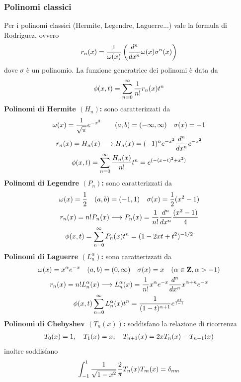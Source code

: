 \documentclass{article}
\begin{document}
\subsubsection{Polinomi classici}
Per i polinomi classici (Hermite, Legendre, Laguerre...) vale la formula di Rodriguez, ovvero
\begin{gather}
    r_n(x) = \frac{1}{\omega(x)}\left(\frac{d^n}{dx^n}\omega(x)\sigma^n(x)\right) \notag
\end{gather}
dove $\sigma$ è un polinomio. La funzione generatrice dei polinomi è data da
\begin{gather}
    \phi(x, t) = \sum_{n = 0}^\infty \frac{1}{n!}r_n(x)t^n \notag
\end{gather}
\textbf{Polinomi di Hermite $(H_n)$:} sono caratterizzati da
\begin{gather}
    \omega(x) = \frac{1}{\sqrt{\pi}}e^{-x^2} \qquad (a, b) = (-\infty, \infty) \quad \sigma(x) = -1 \notag \\
    r_n(x) = H_n(x) \longrightarrow H_n(x) = (-1)^ne^{-x^2}\frac{d^n}{dx^n}e^{-x^2} \notag \\
    \phi(x, t) = \sum_{n = 0}^\infty \frac{H_n(x)}{n!}t^n = e^{(-(x - t)^2 + x^2)} \notag
\end{gather}
\textbf{Polinomi di Legendre $(P_n)$:} sono caratterizzati da
\begin{gather}
    \omega(x) = \frac{1}{2} \quad (a, b) = (-1, 1) \quad \sigma(x) = \frac{1}{2}(x^2 - 1) \notag \\
    r_n(x) = n!P_n(x) \longrightarrow P_n(x) = \frac{1}{n!}\frac{d^n}{dx^n}\frac{(x^2 - 1)}{4} \notag \\
    \phi(x, t) = \sum_{n = 0}^\infty P_n(x)t^n = (1 -2xt + t^2)^{-1/2} \notag
\end{gather}
\textbf{Polinomi di Laguerre $(L^\alpha_n)$:} sono caratterizzati da
\begin{gather}
    \omega(x) = x^\alpha e^{-x} \quad (a, b) = (0, \infty) \quad \sigma(x) = x \quad (\alpha \in \mathbf{Z}, \alpha > -1) \notag \\
    r_n(x) = n!L^\alpha_n(x) \longrightarrow L^\alpha_n(x) = \frac{1}{n!}x^\alpha e^{-x}\frac{d^n}{dx^n}x^{\alpha + n}e^{-x} \notag \\
    \phi(x, t) \sum_{n = 0}^\infty L^\alpha_n(x)t^n = \frac{1}{(1-t)^{\alpha + 1}}e^{\frac{xt}{t-1} \notag}
\end{gather}
\textbf{Polinomi di Chebyshev $(T_n(x))$:} soddisfano la relazione di ricorrenza
\begin{gather}
    T_0(x) = 1, \quad T_1(x) = x, \quad T_{n+1}(x) = 2xT_n(x) - T_{n-1}(x) \notag
\end{gather}
inoltre soddisfano
\begin{gather}
    \int_{-1}^1 \frac{1}{\sqrt{1 - x^2}}\frac{2}{\pi}T_n(x)T_m(x) = \delta_{nm} \notag
\end{gather}
\end{document}
